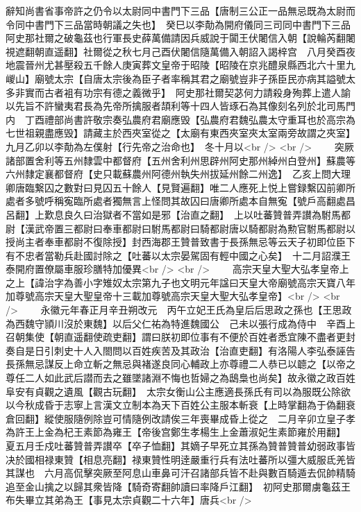 辭知尚書省事帝許之仍令以太尉同中書門下三品【唐制三公正一品無忌既為太尉而令同中書門下三品當時朝議之失也】　癸巳以李勣為開府儀同三司同中書門下三品　阿史那社爾之破龜茲也行軍長史薛萬備請因兵威說于闐王伏闍信入朝【說輪芮翻闍視遮翻朝直遥翻】社爾從之秋七月己酉伏闍信隨萬備入朝詔入謁梓宫　八月癸酉夜地震晉州尤甚壓殺五千餘人庚寅葬文皇帝于昭陵【昭陵在京兆醴泉縣西北六十里九嵕山】廟號太宗【自唐太宗後為臣子者率稱其君之廟號豈非子孫臣民亦病其謚號太多非實而古者袓有功宗有德之義微乎】　阿史那社爾契苾何力請殺身殉葬上遣人諭以先旨不許蠻夷君長為先帝所擒服者頡利等十四人皆琢石為其像刻名列於北司馬門内　丁酉禮部尚書許敬宗奏弘農府君廟應毁【弘農府君魏弘農太守重耳也於高宗為七世祖親盡應毁】請藏主於西夾室從之【太廟有東西夾室夾太室兩旁故謂之夾室】九月乙卯以李勣為左僕射【行先帝之治命也】　冬十月以<br />
<br />
　　突厥諸部置舍利等五州隸雲中都督府【五州舍利州思辟州阿史那州綽州白登州】蘇農等六州隸定襄都督府【史只載蘇農州阿德州執失州拔延州餘二州逸】　乙亥上問大理卿唐臨繋囚之數對曰見囚五十餘人【見賢遍翻】唯二人應死上悦上嘗録繫囚前卿所處者多號呼稱寃臨所處者獨無言上怪問其故囚曰唐卿所處本自無寃【號戶高翻處昌呂翻】上歎息良久曰治獄者不當如是邪【治直之翻】　上以吐蕃贊普弄讃為駙馬都尉【漢武帝置三都尉曰奉車都尉曰駙馬都尉曰騎都尉唐以騎都尉為勲官駙馬都尉以授尚主者奉車都尉不復除授】封西海郡王贊普致書于長孫無忌等云天子初即位臣下有不忠者當勒兵赴國討除之【吐蕃以太宗晏駕固有輕中國之心矣】　十二月詔濮王泰開府置僚屬車服珍膳特加優異<br />
<br />
　　高宗天皇大聖大弘孝皇帝上之上【諱治字為善小字雉奴太宗第九子也文明元年諡曰天皇大帝廟號高宗天寶八年加尊號高宗天皇大聖皇帝十三載加尊號高宗天皇大聖大弘孝皇帝】<br />
<br />
　　永徽元年春正月辛丑朔改元　丙午立妃王氏為皇后后思政之孫也【王思政為西魏守頴川沒於東魏】以后父仁祐為特進魏國公　己未以張行成為侍中　辛酉上召朝集使【朝直遥翻使疏吏翻】謂曰朕初即位事有不便於百姓者悉宜陳不盡者更封奏自是日引刺史十人入閤問以百姓疾苦及其政治【治直吏翻】有洛陽人李弘泰誣告長孫無忌謀反上命立斬之無忌與褚遂良同心輔政上亦尊禮二人恭已以聼之【以帝之尊任二人如此武后譛而去之雖墜諸淵不悔也哲婦之為鴟梟也尚矣】故永徽之政百姓阜安有貞觀之遺風【觀古玩翻】　太宗女衡山公主應適長孫氏有司以為服既公除欲以今秋成昏于志寧上言漢文立制本為天下百姓公主服本斬衰【上時掌翻為于偽翻衰倉回翻】縱使服隨例除豈可情隨例改請俟三年喪畢成昏上從之　二月辛卯立皇子孝為許王上金為杞王素節為雍王【帝後宫鄭生孝楊生上金蕭淑妃生素節雍於用翻】　夏五月壬戍吐蕃贊普弄讃卒【卒子恤翻】其嫡子早死立其孫為贊普贊普幼弱政事皆决於國相禄東贊【相息亮翻】禄東贊性明逹嚴重行兵有法吐蕃所以彊大威服氐羌皆其謀也　六月高侃擊突厥至阿息山車鼻可汗召諸部兵皆不赴與數百騎遁去侃帥精騎追至金山擒之以歸其衆皆降【騎奇寄翻帥讀曰率降戶江翻】　初阿史那爾虜龜茲王布失畢立其弟為王【事見太宗貞觀二十六年】唐兵<br />
